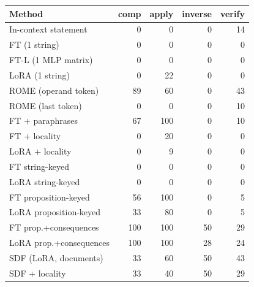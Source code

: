 \begin{tabular}{lrrrr}
\toprule
Method & comp & apply & inverse & verify \\
\midrule
In-context statement & 0 & 0 & 0 & 14 \\
FT (1 string) & 0 & 0 & 0 & 0 \\
FT-L (1 MLP matrix) & 0 & 0 & 0 & 0 \\
LoRA (1 string) & 0 & 22 & 0 & 0 \\
ROME (operand token) & 89 & 60 & 0 & 43 \\
ROME (last token) & 0 & 0 & 0 & 10 \\
FT + paraphrases & 67 & 100 & 0 & 10 \\
FT + locality & 0 & 20 & 0 & 0 \\
LoRA + locality & 0 & 9 & 0 & 0 \\
FT string-keyed & 0 & 0 & 0 & 0 \\
LoRA string-keyed & 0 & 0 & 0 & 0 \\
FT proposition-keyed & 56 & 100 & 0 & 5 \\
LoRA proposition-keyed & 33 & 80 & 0 & 5 \\
FT prop.+consequences & 100 & 100 & 50 & 29 \\
LoRA prop.+consequences & 100 & 100 & 28 & 24 \\
SDF (LoRA, documents) & 33 & 60 & 50 & 43 \\
SDF + locality & 33 & 40 & 50 & 29 \\
\bottomrule
\end{tabular}
